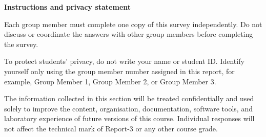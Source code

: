 \documentclass[11pt,a4paper]{article}
\begin{document}
\begin{requirementbox}
\textbf{Instructions and privacy statement}

Each group member must complete one copy of this survey independently.
Do not discuss or coordinate the answers with other group members before
completing the survey.

To protect students' privacy, do not write your name or student ID.
Identify yourself only using the group member number assigned in this report,
for example, Group Member 1, Group Member 2, or Group Member 3.

The information collected in this section will be treated confidentially
and used solely to improve the content, organisation, documentation,
software tools, and laboratory experience of future versions of this course.
Individual responses will not affect the technical mark of Report-3 or any
other course grade.
\end{requirementbox}

\end{document}
